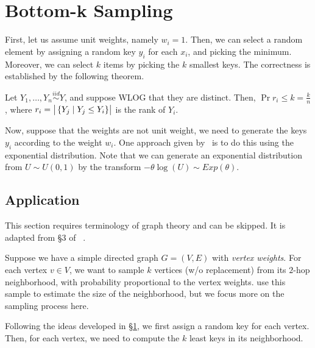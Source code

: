 \documentclass{article}
\newcommand{\iid}{\overset{iid}{\sim}}
\begin{document}
\section{Bottom-k Sampling}
\label{sec:bottomk}

First, let us assume unit weights, namely $w_i = 1$.
Then, we can select a random element by assigning a random key $y_i$ for each $x_i$, and picking the minimum.
Moreover, we can select $k$ items by picking the $k$ smallest keys.
The correctness is established by the following theorem.

\begin{theorem}
	\label{thm:rank}
	Let $Y_1, \ldots, Y_n \iid Y$, and suppose WLOG that they are distinct.
	Then, $\Pr{r_i \le k} = \frac{k}{n}$, where $r_i = \left| \bigr. \left\{ Y_j \mid Y_j \le Y_i \right\} \right|$ is the rank of $Y_i$.
\end{theorem}

Now, suppose that the weights are not unit weight, we need to generate the keys $y_i$ according to the weight $w_i$.
One approach given by~\cite{cohen07-08} is to do this using the exponential distribution.
Note that we can generate an exponential distribution from $U \sim U(0, 1)$ by the transform $- \theta \log(U) \sim Exp(\theta)$.

\subsection{Application}
\label{sec:reach}

This section requires terminology of graph theory and can be skipped.
It is adapted from \S3 of ~\cite{cohen97-12}.

Suppose we have a simple directed graph $G = (V, E)$ with \emph{vertex weights}.
For each vertex $v \in V$, we want to sample $k$ vertices (w/o replacement) from its $2$-hop neighborhood, with probability proportional to the vertex weights.
\cite{cohen97-12} use this sample to estimate the size of the neighborhood, but we focus more on the sampling process here.

Following the ideas developed in \S\ref{sec:bottomk}, we first assign a random key for each vertex.
Then, for each vertex, we need to compute the $k$ least keys in its neighborhood.

\end{document}
